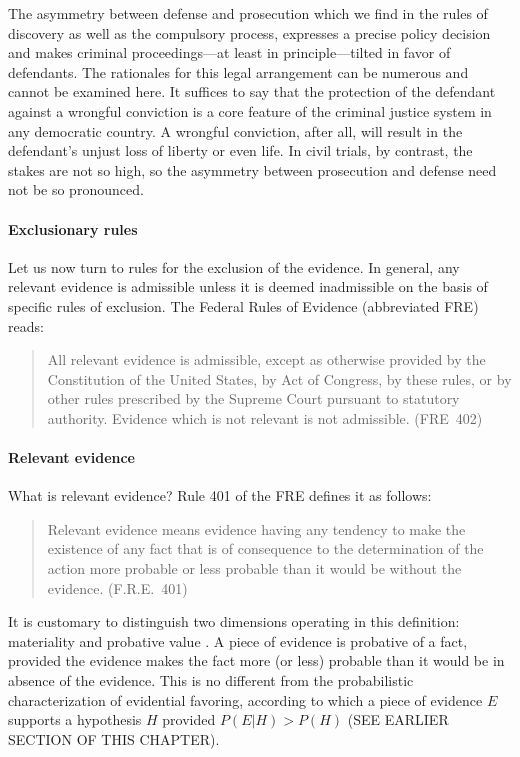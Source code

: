 \documentclass[10pt]{article}
\begin{document}
The asymmetry between defense and prosecution which we find in the rules of discovery as well as the compulsory process, 
expresses a precise policy decision and makes criminal proceedings---at least in principle---tilted 
in favor of defendants. The rationales for this legal arrangement  can be numerous and cannot be examined here. 
It suffices to say that the protection of the defendant against a wrongful conviction is a core 
feature of the criminal justice system in any democratic country. A wrongful conviction, after all, will result 
 in the defendant's unjust loss of liberty or even life. In civil trials, by contrast, the stakes are not so high, 
so the asymmetry between prosecution and defense need not be so pronounced.



\paragraph{Exclusionary rules}

Let us now turn to rules for the exclusion of the evidence. In general, any relevant evidence is admissible 
unless it is deemed inadmissible on the basis of specific rules of exclusion. %
The Federal Rules of Evidence (abbreviated FRE) reads:
%
\begin{quote}
\begin{singlespace}
All relevant evidence is admissible, except as otherwise provided by the Constitution of the United States, by Act of Congress, by these rules, or by other rules prescribed by the Supreme Court pursuant to statutory authority. Evidence which is not relevant is not admissible. (FRE\ 402)
\end{singlespace}
\end{quote}
%

\paragraph{Relevant evidence}
What is relevant evidence? 
Rule 401 of the FRE defines it as follows:
%
\begin{quote}
\begin{singlespace}
Relevant evidence means evidence having any tendency to make the existence of any fact that is of consequence to the determination of the action more probable or less probable than it would be without the evidence. (F.R.E.\ 401)
\end{singlespace}
\end{quote}
%
It is customary to distinguish two dimensions operating in this definition: materiality and probative value \citep{Fisher2008Evidence, Mendez2008}. A piece of evidence is probative of a fact, provided the evidence makes the fact more (or less) probable than it would be in absence of the evidence. This is no different from the probabilistic characterization of 
evidential favoring, according to which a piece of evidence $E$ supports a hypothesis $H$ provided $P(E|H)> P(H)$ (SEE EARLIER SECTION OF THIS CHAPTER). 
\end{document}
